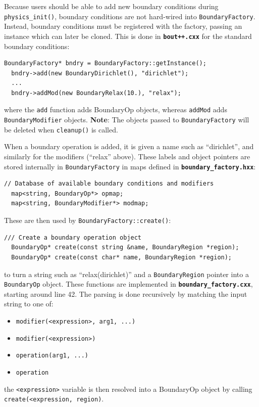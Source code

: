 \documentclass[12pt]{article}
\newcommand{\code}[1]{\texttt{#1}}
\newcommand{\file}[1]{\texttt{\bf #1}}
\begin{document}
Because users should be able to add new boundary conditions during
\code{physics\_init()}, boundary conditions are not hard-wired into
\code{BoundaryFactory}. Instead, boundary conditions must be registered
with the factory, passing an instance which can later be cloned. This
is done in \file{bout++.cxx} for the standard boundary conditions:
\begin{lstlisting}[firstnumber=258]
  BoundaryFactory* bndry = BoundaryFactory::getInstance();
  bndry->add(new BoundaryDirichlet(), "dirichlet");
  ...
  bndry->addMod(new BoundaryRelax(10.), "relax");
\end{lstlisting}
where the \code{add} function adds BoundaryOp objects, whereas
\code{addMod} adds \code{BoundaryModifier} objects. {\bf Note}: The
objects passed to \code{BoundaryFactory} will be deleted when \code{cleanup()}
is called. 

When a boundary operation is added, it is given a name
such as ``dirichlet'', and similarly for the modifiers (``relax'' above).
These labels and object pointers are stored internally in \code{BoundaryFactory}
in maps defined in \file{boundary\_factory.hxx}:
\begin{lstlisting}[firstnumber=43]
  // Database of available boundary conditions and modifiers
  map<string, BoundaryOp*> opmap;
  map<string, BoundaryModifier*> modmap;
\end{lstlisting}
These are then used by \code{BoundaryFactory::create()}:
\begin{lstlisting}[firstnumber=24]
  /// Create a boundary operation object
  BoundaryOp* create(const string &name, BoundaryRegion *region);
  BoundaryOp* create(const char* name, BoundaryRegion *region);
\end{lstlisting}
to turn a string such as ``relax(dirichlet)'' and a \code{BoundaryRegion}
pointer into a \code{BoundaryOp} object. These functions are implemented
in \file{boundary\_factory.cxx}, starting around line 42. The parsing is
done recursively by matching the input string to one of:
\begin{itemize}
\item \code{modifier(<expression>, arg1, ...)}
\item \code{modifier(<expression>)}
\item \code{operation(arg1, ...)}
\item \code{operation}
\end{itemize}
the \code{<expression>} variable is then resolved into a BoundaryOp
object by calling \code{create(<expression, region)}.
\end{document}
